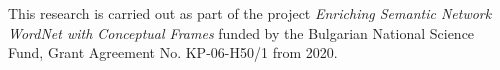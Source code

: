 \documentclass[output=paper,colorlinks,citecolor=brown]{langscibook}
\begin{document}
This research is carried out as part of the project \emph{Enriching Semantic Network WordNet with Conceptual Frames} funded by the Bulgarian National Science Fund, Grant Agreement No. KP-06-H50/1 from 2020.



{\sloppy\printbibliography[heading=subbibliography,notkeyword=this]}
\end{document}
